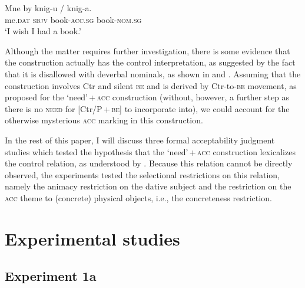 \documentclass[output=paper]{langscibook}
\begin{document}
\ea \label{by}
\gll Mne by knig-u / \minsp{*} knig-a.\\
me.\textsc{dat} \textsc{sbjv} book-\textsc{acc.sg} {} {} book-\textsc{nom.sg}\\
\glt `I wish I had a book.'
\z

\noindent Although the matter requires further investigation, there is some evidence that the construction actually has the control interpretation, as suggested by the fact that it is disallowed with deverbal nominals, as shown in  and . Assuming that the construction involves Ctr and silent \textsc{be} and is derived by Ctr-to-\textsc{be} movement, as proposed for the `need'\,+\,\textsc{acc} construction (without, however, a further step as there is no \textsc{need} for [Ctr/P\,+\,\textsc{be}] to incorporate into), we could account for the otherwise mysterious \textsc{acc} marking in this construction.

\ea
{}
\z\z

\noindent In the rest of this paper, I will discuss three formal acceptability judgment studies which tested the hypothesis that the `need'\,+\,\textsc{acc} construction lexicalizes the control relation, as understood by \citet{Vikner.Jensen2002}. Because this relation cannot be directly observed, the experiments tested the selectional restrictions on this relation, namely the animacy restriction on the dative subject and the restriction on the \textsc{acc} theme to (concrete) physical objects, i.e., the concreteness restriction.

\section{Experimental studies\label{section-experiments}}

\subsection{Experiment 1a}
\end{document}
